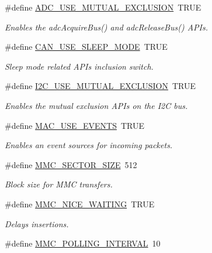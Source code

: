 \begin{DoxyCompactItemize}
\#define \hyperlink{group___h_a_l___c_o_n_f_gac0893cb47e338c2dabad34b974a0a88d}{A\+D\+C\+\_\+\+U\+S\+E\+\_\+\+M\+U\+T\+U\+A\+L\+\_\+\+E\+X\+C\+L\+U\+S\+I\+O\+N}~T\+R\+U\+E
\begin{DoxyCompactList}\small\item\em Enables the {\ttfamily adc\+Acquire\+Bus()} and {\ttfamily adc\+Release\+Bus()} A\+P\+Is. \end{DoxyCompactList}\item 
\#define \hyperlink{group___h_a_l___c_o_n_f_ga5294d9d12e4186c781df3b2f1d8bd80b}{C\+A\+N\+\_\+\+U\+S\+E\+\_\+\+S\+L\+E\+E\+P\+\_\+\+M\+O\+D\+E}~T\+R\+U\+E
\begin{DoxyCompactList}\small\item\em Sleep mode related A\+P\+Is inclusion switch. \end{DoxyCompactList}\item 
\#define \hyperlink{group___h_a_l___c_o_n_f_ga7125642404a6fd3d4985d1cb6e1b7b0a}{I2\+C\+\_\+\+U\+S\+E\+\_\+\+M\+U\+T\+U\+A\+L\+\_\+\+E\+X\+C\+L\+U\+S\+I\+O\+N}~T\+R\+U\+E
\begin{DoxyCompactList}\small\item\em Enables the mutual exclusion A\+P\+Is on the I2\+C bus. \end{DoxyCompactList}\item 
\#define \hyperlink{group___h_a_l___c_o_n_f_ga887da1c1383a9e7b45c4464877a7e05e}{M\+A\+C\+\_\+\+U\+S\+E\+\_\+\+E\+V\+E\+N\+T\+S}~T\+R\+U\+E
\begin{DoxyCompactList}\small\item\em Enables an event sources for incoming packets. \end{DoxyCompactList}\item 
\#define \hyperlink{group___h_a_l___c_o_n_f_ga502a0143be4c303f3006c0888e1cec82}{M\+M\+C\+\_\+\+S\+E\+C\+T\+O\+R\+\_\+\+S\+I\+Z\+E}~512
\begin{DoxyCompactList}\small\item\em Block size for M\+M\+C transfers. \end{DoxyCompactList}\item 
\#define \hyperlink{group___h_a_l___c_o_n_f_ga3087dfffa81dd8a0a80ee92746e65fe2}{M\+M\+C\+\_\+\+N\+I\+C\+E\+\_\+\+W\+A\+I\+T\+I\+N\+G}~T\+R\+U\+E
\begin{DoxyCompactList}\small\item\em Delays insertions. \end{DoxyCompactList}\item 
\#define \hyperlink{group___h_a_l___c_o_n_f_gac57e95210b57d6699c23bfb648e0904d}{M\+M\+C\+\_\+\+P\+O\+L\+L\+I\+N\+G\+\_\+\+I\+N\+T\+E\+R\+V\+A\+L}~10

\end{DoxyCompactItemize}
